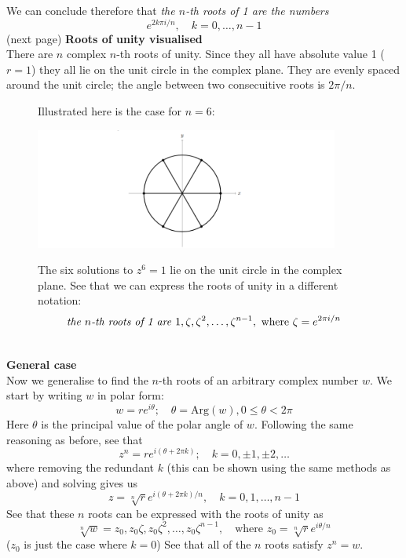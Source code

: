 \documentclass{report}
\begin{document}
We can conclude therefore that \textit{the $n$-th roots of 1 are the numbers}
\begin{equation*}
e^{2k\pi i/n},\quad k=0,\ldots,n-1
\end{equation*}
(next page)
\newpage
\noindent\textbf{Roots of unity visualised}\\
There are $n$ complex $n$-th roots of unity. Since they all have absolute value 1 ($r=1$) they all lie on the unit
circle in the complex plane. They are evenly spaced around the unit circle; the angle between two consecuitive
roots is $2\pi/n$.
\begin{figure}[h]
Illustrated here is the case for $n=6$:
\begin{center}
\includegraphics[width=10cm]{9}\\
\end{center}
The six solutions to $z^6=1$ lie on the unit circle in the complex plane. 
See that we can express the roots of unity in
a different notation:
\begin{equation*}
\text{\textit{the $n$-th roots of 1 are} }1,\zeta,\zeta^2,\ldots,\zeta^{n-1},\text{ where }\zeta=e^{2\pi i/n}
\end{equation*}
\end{figure}\\
\textbf{General case}\\
Now we generalise to find the $n$-th roots of an arbitrary complex number $w$. We start by writing $w$ in
polar form:
\begin{equation*}
w=re^{i\theta};\quad\theta=\text{Arg}(w),0\leq\theta<2\pi
\end{equation*}
Here $\theta$ is the principal value of the polar angle of $w$. Following the same reasoning as before, see that
\begin{equation*}
z^n=re^{i(\theta+2\pi k)};\quad k=0,\pm1,\pm2,\ldots
\end{equation*}
where removing the redundant $k$  (this can be shown using the same methods as above) and solving gives us
\begin{equation*}
z=\sqrt[n]{r}e^{i(\theta+2\pi k)/n},\quad k=0,1,\ldots,n-1
\end{equation*}
See that these $n$ roots can be expressed with the roots of unity as
\begin{equation*}
\sqrt[n]{w}=z_0,z_0\zeta,z_0\zeta^2,\ldots,z_0\zeta^{n-1},\quad\text{where }z_0=\sqrt[n]{r}e^{i\theta/n}
\end{equation*}
($z_0$ is just the case where $k=0$) See that all of the $n$ roots satisfy $z^n=w$.
\newpage
\end{document}
